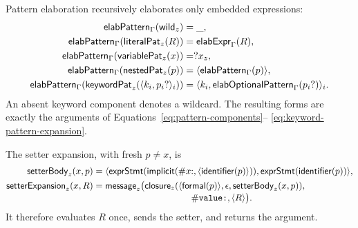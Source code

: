 Pattern elaboration recursively elaborates only embedded expressions:
\begin{equation}\label{eq:pattern-elaboration}
\begin{aligned}
 \mathsf{elabPattern}_{\Gamma}(\mathsf{wild}_{z})&=\_,\\
 \mathsf{elabPattern}_{\Gamma}(\mathsf{literalPat}_{z}(R))&=
      \mathsf{elabExpr}_{\Gamma}(R),\\
 \mathsf{elabPattern}_{\Gamma}(\mathsf{variablePat}_{z}(x))&=?x_z,\\
 \mathsf{elabPattern}_{\Gamma}(\mathsf{nestedPat}_{z}(p))&=
      \langle\mathsf{elabPattern}_{\Gamma}(p)\rangle,\\
 \mathsf{elabPattern}_{\Gamma}
    (\mathsf{keywordPat}_{z}(\langle k_i,p_i?\rangle_i))&=
      \langle k_i,
        \mathsf{elabOptionalPattern}_{\Gamma}(p_i?)\rangle_i.
\end{aligned}
\end{equation}
An absent keyword component denotes a wildcard.  The resulting forms are
exactly the arguments of Equations~\eqref{eq:pattern-components}--
\eqref{eq:keyword-pattern-expansion}.

The setter expansion, with fresh $p\ne x$, is
\begin{equation}\label{eq:setter-expansion}
\begin{aligned}
 \mathsf{setterBody}_{z}(x,p)&=
   \langle\kw{exprStmt}(\kw{implicit}(\#x{:},
      \langle\kw{identifier}(p)\rangle)),
      \kw{exprStmt}(\kw{identifier}(p))\rangle,\\
 \mathsf{setterExpansion}_{z}(x,R)&=
   \kw{message}_{z}\bigl(\kw{closure}_{z}
      (\langle\kw{formal}(p)\rangle,\epsilon,
       \mathsf{setterBody}_{z}(x,p)),\\[-1mm]
 &\hspace{38mm}\selsym{value:},\langle R\rangle\bigr).
\end{aligned}
\end{equation}
It therefore evaluates $R$ once, sends the setter, and returns the argument.

